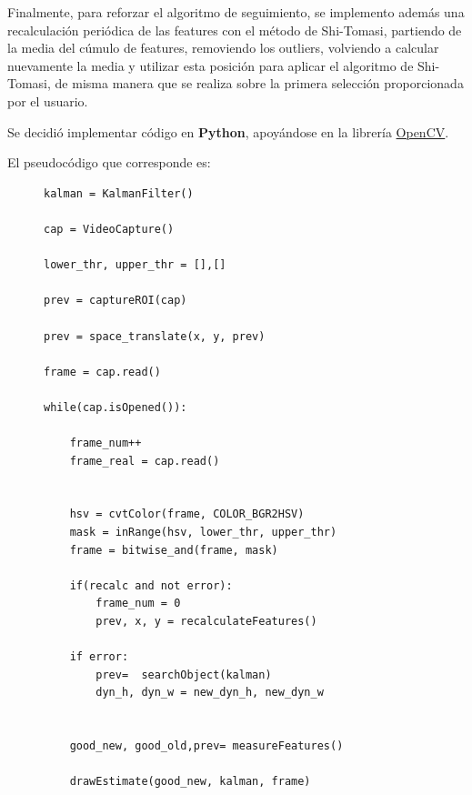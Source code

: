 Finalmente, para reforzar el algoritmo de seguimiento, se implemento además una recalculación periódica de las features con el método de Shi-Tomasi, partiendo de la media del cúmulo de features, removiendo los outliers, volviendo a calcular nuevamente la media y utilizar esta posición para aplicar el algoritmo de Shi-Tomasi, de misma manera que se realiza sobre la primera selección proporcionada por el usuario.



Se decidió implementar código en \textbf{Python}, apoyándose en la librería \href{https://opencv.org/}{OpenCV}.



El pseudocódigo que corresponde es:


 
\begin{figure}[H]

\begin{lstlisting}
kalman = KalmanFilter()

cap = VideoCapture()

lower_thr, upper_thr = [],[]

prev = captureROI(cap)

prev = space_translate(x, y, prev)

frame = cap.read()

while(cap.isOpened()):

    frame_num++
    frame_real = cap.read()


    hsv = cvtColor(frame, COLOR_BGR2HSV)
    mask = inRange(hsv, lower_thr, upper_thr)
    frame = bitwise_and(frame, mask)

    if(recalc and not error):
        frame_num = 0
        prev, x, y = recalculateFeatures()

    if error:
        prev=  searchObject(kalman)
        dyn_h, dyn_w = new_dyn_h, new_dyn_w


    good_new, good_old,prev= measureFeatures()

    drawEstimate(good_new, kalman, frame)

\end{lstlisting}
\end{figure} 
 




